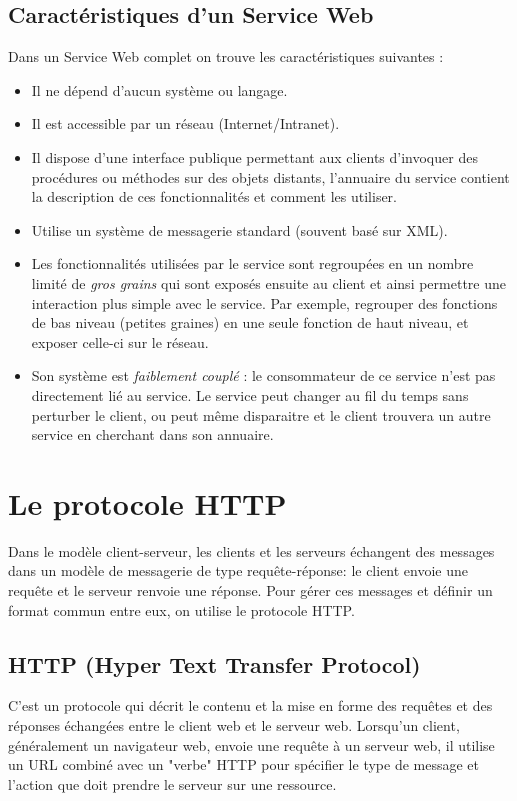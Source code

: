 			
\subsection{Caractéristiques d'un Service Web}
Dans un Service Web complet on trouve les caractéristiques suivantes :\cite{refTutorialPointsWS}
\begin{itemize}
	\item Il ne dépend d'aucun système ou langage.
	\item Il est accessible par un réseau (Internet/Intranet).
	\item Il dispose d'une interface publique permettant aux clients d'invoquer des procédures ou méthodes sur des objets distants, l'annuaire du service contient la description de ces fonctionnalités et comment les utiliser.
	\item Utilise un système de messagerie standard (souvent basé sur XML).
	\item Les fonctionnalités utilisées par le service sont regroupées en un nombre limité de \emph{gros grains} qui sont exposés ensuite au client et ainsi permettre une interaction plus simple avec le service. Par exemple, regrouper des fonctions de bas niveau (petites graines) en une seule fonction de haut niveau, et exposer celle-ci sur le réseau.
	\item Son système est \emph{faiblement couplé} : le consommateur de ce service n'est pas directement lié au service. Le service peut changer au fil du temps sans perturber le client, ou peut même disparaitre et le client trouvera un autre service en cherchant dans son annuaire.
\end{itemize}
		
\newpage
\section{Le protocole HTTP}
Dans le modèle client-serveur, les clients et les serveurs échangent des messages dans un modèle de messagerie de type requête-réponse: le client envoie une requête et le serveur renvoie une réponse.
Pour gérer ces messages et définir un format commun entre eux, on utilise le protocole HTTP.

\subsection{HTTP (Hyper Text Transfer Protocol)}
C'est un protocole qui décrit le contenu et la mise en forme des requêtes et des réponses échangées entre le client web et le serveur web. 
Lorsqu'un client, généralement un navigateur web, envoie une requête à un serveur web, il utilise un URL combiné avec un "verbe" HTTP pour spécifier le type de message et l'action que doit prendre le serveur sur une ressource.

